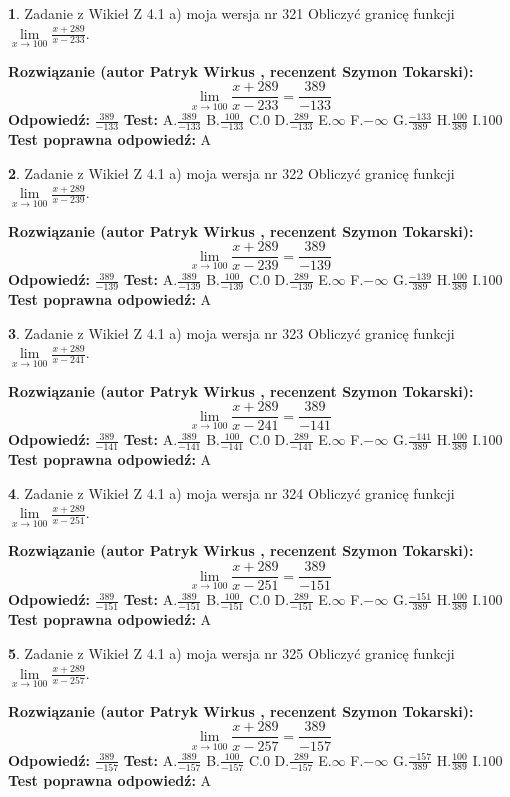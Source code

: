 \documentclass[12pt, a4paper]{article}
\theoremstyle{definition} %
\newtheorem{zad}{}
\newcommand{\zadStart}[1]{\begin{zad}#1\newline}
\newcommand{\zadStop}{\end{zad}}
\newcommand{\rozwStart}[2]{\noindent \textbf{Rozwiązanie (autor #1 , recenzent #2): }\newline}
\newcommand{\rozwStop}{\newline}
\newcommand{\odpStart}{\noindent \textbf{Odpowiedź:}\newline}
\newcommand{\odpStop}{\newline}
\newcommand{\testStart}{\noindent \textbf{Test:}\newline}
\newcommand{\testStop}{\newline}
\newcommand{\kluczStart}{\noindent \textbf{Test poprawna odpowiedź:}\newline}
\newcommand{\kluczStop}{\newline}
\begin{document}
\zadStart{Zadanie z Wikieł Z 4.1 a) moja wersja nr 321}
Obliczyć granicę funkcji $\lim\limits_{x\to100}\frac{x+289}{x-233}$.
\zadStop
\rozwStart{Patryk Wirkus}{Szymon Tokarski}
$$\lim\limits_{x\to100}\frac{x+289}{x-233} = \frac{389}{-133}$$
\rozwStop
\odpStart
$\frac{389}{-133}$
\odpStop
\testStart
A.$\frac{389}{-133}$
B.$\frac{100}{-133}$
C.$0$
D.$\frac{289}{-133}$
E.$\infty$
F.$-\infty$
G.$\frac{-133}{389}$
H.$\frac{100}{389}$
I.$100$
\testStop
\kluczStart
A
\kluczStop



\zadStart{Zadanie z Wikieł Z 4.1 a) moja wersja nr 322}
Obliczyć granicę funkcji $\lim\limits_{x\to100}\frac{x+289}{x-239}$.
\zadStop
\rozwStart{Patryk Wirkus}{Szymon Tokarski}
$$\lim\limits_{x\to100}\frac{x+289}{x-239} = \frac{389}{-139}$$
\rozwStop
\odpStart
$\frac{389}{-139}$
\odpStop
\testStart
A.$\frac{389}{-139}$
B.$\frac{100}{-139}$
C.$0$
D.$\frac{289}{-139}$
E.$\infty$
F.$-\infty$
G.$\frac{-139}{389}$
H.$\frac{100}{389}$
I.$100$
\testStop
\kluczStart
A
\kluczStop



\zadStart{Zadanie z Wikieł Z 4.1 a) moja wersja nr 323}
Obliczyć granicę funkcji $\lim\limits_{x\to100}\frac{x+289}{x-241}$.
\zadStop
\rozwStart{Patryk Wirkus}{Szymon Tokarski}
$$\lim\limits_{x\to100}\frac{x+289}{x-241} = \frac{389}{-141}$$
\rozwStop
\odpStart
$\frac{389}{-141}$
\odpStop
\testStart
A.$\frac{389}{-141}$
B.$\frac{100}{-141}$
C.$0$
D.$\frac{289}{-141}$
E.$\infty$
F.$-\infty$
G.$\frac{-141}{389}$
H.$\frac{100}{389}$
I.$100$
\testStop
\kluczStart
A
\kluczStop



\zadStart{Zadanie z Wikieł Z 4.1 a) moja wersja nr 324}
Obliczyć granicę funkcji $\lim\limits_{x\to100}\frac{x+289}{x-251}$.
\zadStop
\rozwStart{Patryk Wirkus}{Szymon Tokarski}
$$\lim\limits_{x\to100}\frac{x+289}{x-251} = \frac{389}{-151}$$
\rozwStop
\odpStart
$\frac{389}{-151}$
\odpStop
\testStart
A.$\frac{389}{-151}$
B.$\frac{100}{-151}$
C.$0$
D.$\frac{289}{-151}$
E.$\infty$
F.$-\infty$
G.$\frac{-151}{389}$
H.$\frac{100}{389}$
I.$100$
\testStop
\kluczStart
A
\kluczStop



\zadStart{Zadanie z Wikieł Z 4.1 a) moja wersja nr 325}
Obliczyć granicę funkcji $\lim\limits_{x\to100}\frac{x+289}{x-257}$.
\zadStop
\rozwStart{Patryk Wirkus}{Szymon Tokarski}
$$\lim\limits_{x\to100}\frac{x+289}{x-257} = \frac{389}{-157}$$
\rozwStop
\odpStart
$\frac{389}{-157}$
\odpStop
\testStart
A.$\frac{389}{-157}$
B.$\frac{100}{-157}$
C.$0$
D.$\frac{289}{-157}$
E.$\infty$
F.$-\infty$
G.$\frac{-157}{389}$
H.$\frac{100}{389}$
I.$100$
\testStop
\kluczStart
A
\kluczStop
\end{document}
